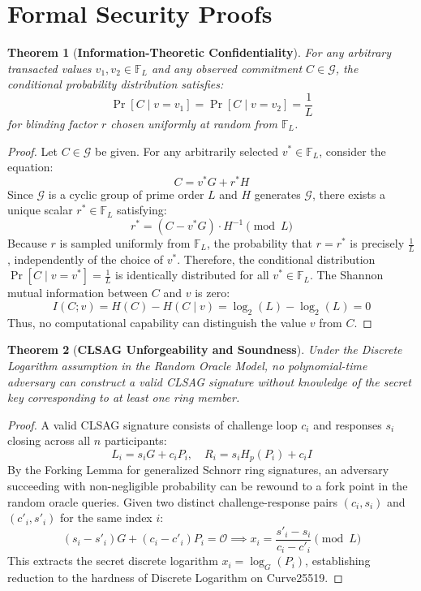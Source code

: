 \documentclass[11pt,a4paper]{article}
\newtheorem{theorem}{Theorem}
\begin{document}
\section{Formal Security Proofs}

\begin{theorem}[\textbf{Information-Theoretic Confidentiality}]
For any arbitrary transacted values $v_1, v_2 \in \mathbb{F}_L$ and any observed commitment $C \in \mathcal{G}$, the conditional probability distribution satisfies:
\[
\Pr[C \mid v = v_1] = \Pr[C \mid v = v_2] = \frac{1}{L}
\]
for blinding factor $r$ chosen uniformly at random from $\mathbb{F}_L$.
\end{theorem}

\begin{proof}
Let $C \in \mathcal{G}$ be given. For any arbitrarily selected $v^* \in \mathbb{F}_L$, consider the equation:
\[
C = v^* G + r^* H
\]
Since $\mathcal{G}$ is a cyclic group of prime order $L$ and $H$ generates $\mathcal{G}$, there exists a unique scalar $r^* \in \mathbb{F}_L$ satisfying:
\[
r^* = (C - v^* G) \cdot H^{-1} \pmod L
\]
Because $r$ is sampled uniformly from $\mathbb{F}_L$, the probability that $r = r^*$ is precisely $\frac{1}{L}$, independently of the choice of $v^*$. Therefore, the conditional distribution $\Pr[C \mid v = v^*] = \frac{1}{L}$ is identically distributed for all $v^* \in \mathbb{F}_L$. The Shannon mutual information between $C$ and $v$ is zero:
\[
I(C; v) = H(C) - H(C \mid v) = \log_2(L) - \log_2(L) = 0
\]
Thus, no computational capability can distinguish the value $v$ from $C$.
\end{proof}

\begin{theorem}[\textbf{CLSAG Unforgeability and Soundness}]
Under the Discrete Logarithm assumption in the Random Oracle Model, no polynomial-time adversary can construct a valid CLSAG signature without knowledge of the secret key corresponding to at least one ring member.
\end{theorem}

\begin{proof}
A valid CLSAG signature consists of challenge loop $c_i$ and responses $s_i$ closing across all $n$ participants:
\[
L_i = s_i G + c_i P_i, \quad R_i = s_i H_p(P_i) + c_i I
\]
By the Forking Lemma for generalized Schnorr ring signatures, an adversary succeeding with non-negligible probability can be rewound to a fork point in the random oracle queries. Given two distinct challenge-response pairs $(c_i, s_i)$ and $(c'_i, s'_i)$ for the same index $i$:
\[
(s_i - s'_i)G + (c_i - c'_i)P_i = \mathcal{O} \implies x_i = \frac{s'_i - s_i}{c_i - c'_i} \pmod L
\]
This extracts the secret discrete logarithm $x_i = \log_G(P_i)$, establishing reduction to the hardness of Discrete Logarithm on Curve25519.
\end{proof}
\end{document}
